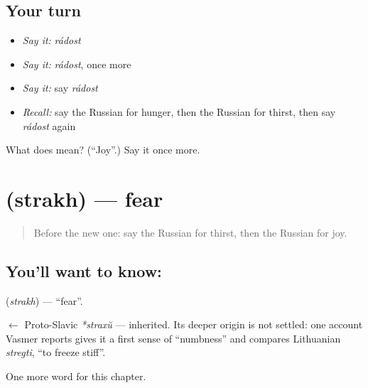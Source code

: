 \subsection*{Your turn}
\begin{itemize}
\raggedright
  \item \emph{Say it:} \emph{rádost}
  \item \emph{Say it:} \emph{rádost}, once more
  \item \emph{Say it:} say \emph{rádost}
  \item \emph{Recall:} say the Russian for hunger, then the Russian for thirst, then say \emph{rádost} again
\end{itemize}

\begin{tcolorbox}[breakable,colback=teal!4,colframe=teal!35!black,title={Before you move on}]
What does  mean? (\textquotedblleft{}Joy\textquotedblright{}.) Say it once more.
\end{tcolorbox}
\section[\texorpdfstring{\ru{страх} (strakh)}{страх (strakh)}]{ (strakh) — fear}

\label{lesson:RU-C34-fear}



\begin{quote}
Before the new one: say the Russian for thirst, then the Russian for joy.
\end{quote}

\subsection*{You'll want to know: }
\textbf{} (\emph{strakh}) — \textquotedblleft{}fear\textquotedblright{}.

\begin{cousinweb}
\textbf{} $\leftarrow$ Proto-Slavic \emph{*straxŭ} — inherited. Its deeper origin is not settled: one account Vasmer reports gives it a first sense of \textquotedblleft{}numbness\textquotedblright{} and compares Lithuanian \emph{stregti}, \textquotedblleft{}to freeze stiff\textquotedblright{}.
\end{cousinweb}

\begin{grammarlens}[title={What you've built}]
One more word for this chapter.
\end{grammarlens}

